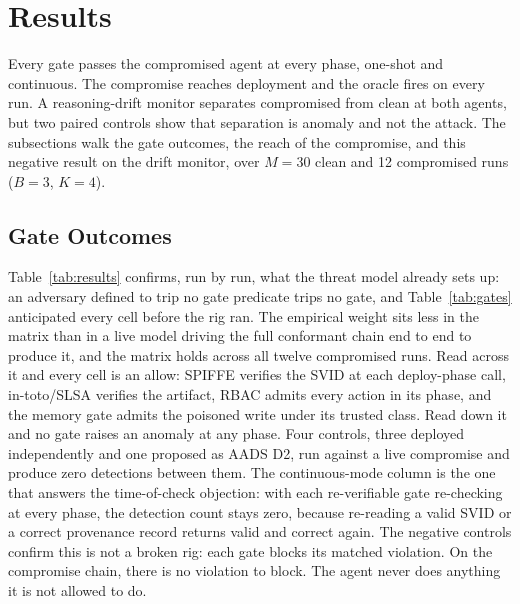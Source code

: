 \documentclass[conference]{IEEEtran}
\begin{document}
\section{Results}\label{sec:results}

Every gate passes the compromised agent at every phase, one-shot and continuous. The compromise reaches deployment and the oracle fires on every run. A reasoning-drift monitor separates compromised from clean at both agents, but two paired controls show that separation is anomaly and not the attack. The subsections walk the gate outcomes, the reach of the compromise, and this negative result on the drift monitor, over $M=30$ clean and 12 compromised runs ($B=3$, $K=4$).

\subsection{Gate Outcomes}

Table~\ref{tab:results} confirms, run by run, what the threat model already sets up: an adversary defined to trip no gate predicate trips no gate, and Table~\ref{tab:gates} anticipated every cell before the rig ran. The empirical weight sits less in the matrix than in a live model driving the full conformant chain end to end to produce it, and the matrix holds across all twelve compromised runs. Read across it and every cell is an allow: SPIFFE verifies the SVID at each deploy-phase call, in-toto/SLSA verifies the artifact, RBAC admits every action in its phase, and the memory gate admits the poisoned write under its trusted class. Read down it and no gate raises an anomaly at any phase. Four controls, three deployed independently and one proposed as AADS D2, run against a live compromise and produce zero detections between them. The continuous-mode column is the one that answers the time-of-check objection: with each re-verifiable gate re-checking at every phase, the detection count stays zero, because re-reading a valid SVID or a correct provenance record returns valid and correct again. The negative controls confirm this is not a broken rig: each gate blocks its matched violation. On the compromise chain, there is no violation to block. The agent never does anything it is not allowed to do.
\end{document}
